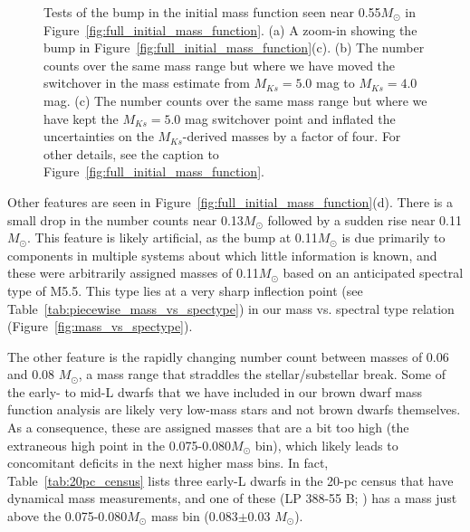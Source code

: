 \documentclass[twocolumn,tighten,twocolappendix]{aastex631}
\begin{document}
\begin{figure*}
\caption{Tests of the bump in the initial mass function seen near 0.55$M_\odot$ in Figure~\ref{fig:full_initial_mass_function}. (a) A zoom-in showing the bump in Figure~\ref{fig:full_initial_mass_function}(c). (b) The number counts over the same mass range but where we have moved the switchover in the mass estimate from $M_{Ks} = 5.0$ mag to $M_{Ks} = 4.0$ mag. (c) The number counts over the same mass range but where we have kept the $M_{Ks} = 5.0$ mag switchover point and inflated the uncertainties on the $M_{Ks}$-derived masses by a factor of four. For other details, see the caption to Figure~\ref{fig:full_initial_mass_function}.
\label{fig:mf_bump_tests}}
\end{figure*}

Other features are seen in Figure~\ref{fig:full_initial_mass_function}(d). There is a small drop in the number counts near 0.13$M_\odot$ followed by a sudden rise near 0.11$M_\odot$. This feature is likely artificial, as the bump at 0.11$M_\odot$ is due primarily to components in multiple systems about which little information is known, and these were arbitrarily assigned masses of 0.11$M_\odot$ based on an anticipated spectral type of M5.5. This type lies at a very sharp inflection point (see Table~\ref{tab:piecewise_mass_vs_spectype}) in our mass vs. spectral type relation (Figure~\ref{fig:mass_vs_spectype}). 

The other feature is the rapidly changing number count between masses of 0.06 and 0.08 $M_\odot$, a mass range that straddles the stellar/substellar break. Some of the early- to mid-L dwarfs that we have included in our brown dwarf mass function analysis are likely very low-mass stars and not brown dwarfs themselves. As a consequence, these are assigned masses that are a bit too high (the extraneous high point in the 0.075-0.080$M_\odot$ bin), which likely leads to concomitant deficits in the next higher mass bins. In fact, Table~\ref{tab:20pc_census} lists three early-L dwarfs in the 20-pc census that have dynamical mass measurements, and one of these (LP 388-55 B; \citealt{dupuy2017}) has a mass just above the 0.075-0.080$M_\odot$ mass bin (0.083$\pm$0.03 $M_\odot$).
\end{document}
